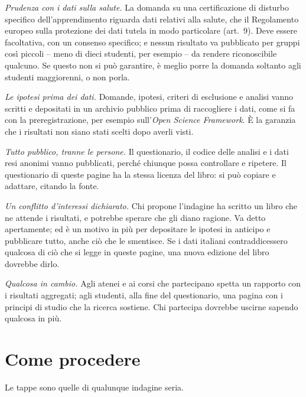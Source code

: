 \emph{Prudenza con i dati sulla salute.} La domanda su una
certificazione di disturbo specifico dell'apprendimento riguarda dati
relativi alla salute, che il Regolamento europeo sulla protezione dei
dati tutela in modo particolare (art.~9). Deve essere facoltativa, con
un consenso specifico; e nessun risultato va pubblicato per gruppi così
piccoli -- meno di dieci studenti, per esempio -- da rendere riconoscibile
qualcuno. Se questo non si può garantire, è meglio porre la domanda
soltanto agli studenti maggiorenni, o non porla.

\emph{Le ipotesi prima dei dati.} Domande, ipotesi, criteri di
esclusione e analisi vanno scritti e depositati in un archivio pubblico
prima di raccogliere i dati, come si fa con la preregistrazione, per
esempio sull'\emph{Open Science Framework}. È la garanzia che i
risultati non siano stati scelti dopo averli visti.

\emph{Tutto pubblico, tranne le persone.} Il questionario, il codice
delle analisi e i dati resi anonimi vanno pubblicati, perché chiunque
possa controllare e ripetere. Il questionario di queste pagine ha la
stessa licenza del libro: si può copiare e adattare, citando la fonte.

\emph{Un conflitto d'interessi dichiarato.} Chi propone l'indagine ha
scritto un libro che ne attende i risultati, e potrebbe sperare che gli
diano ragione. Va detto apertamente; ed è un motivo in più per
depositare le ipotesi in anticipo e pubblicare tutto, anche ciò che le
smentisce. Se i dati italiani contraddicessero qualcosa di ciò che si
legge in queste pagine, una nuova edizione del libro dovrebbe dirlo.

\emph{Qualcosa in cambio.} Agli atenei e ai corsi che partecipano
spetta un rapporto con i risultati aggregati; agli studenti, alla fine
del questionario, una pagina con i principi di studio che la ricerca
sostiene. Chi partecipa dovrebbe uscirne sapendo qualcosa in più.

\section{Come procedere}

Le tappe sono quelle di qualunque indagine seria.

